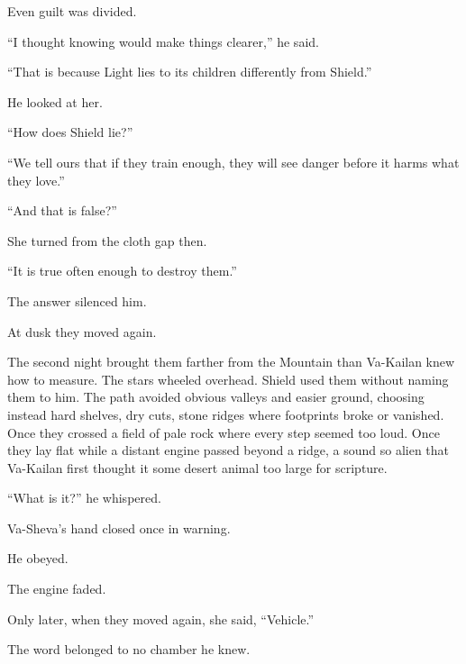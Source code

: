 Even guilt was divided.\par

“I thought knowing would make things clearer,” he said.\par

“That is because Light lies to its children differently from Shield.”\par

He looked at her.\par

“How does Shield lie?”\par

“We tell ours that if they train enough, they will see danger before it harms what they love.”\par

“And that is false?”\par

She turned from the cloth gap then.\par

“It is true often enough to destroy them.”\par

The answer silenced him.\par

At dusk they moved again.\par

The second night brought them farther from the Mountain than Va-Kailan knew how to measure. The stars wheeled overhead. Shield used them without naming them to him. The path avoided obvious valleys and easier ground, choosing instead hard shelves, dry cuts, stone ridges where footprints broke or vanished. Once they crossed a field of pale rock where every step seemed too loud. Once they lay flat while a distant engine passed beyond a ridge, a sound so alien that Va-Kailan first thought it some desert animal too large for scripture.\par

“What is it?” he whispered.\par

Va-Sheva’s hand closed once in warning.\par

He obeyed.\par

The engine faded.\par

Only later, when they moved again, she said, “Vehicle.”\par

The word belonged to no chamber he knew.\par

